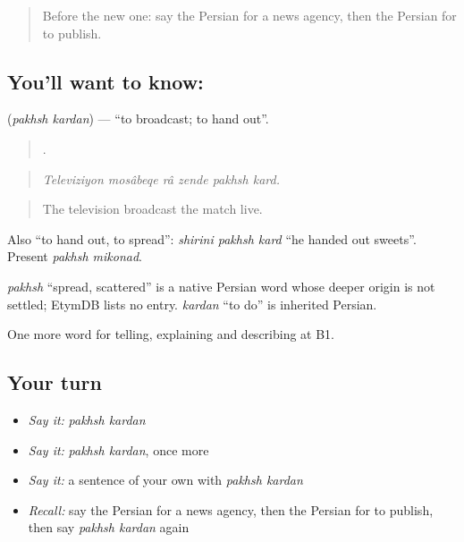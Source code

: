 \begin{quote}
Before the new one: say the Persian for a news agency, then the Persian for to publish.
\end{quote}

\subsection*{You'll want to know:  }
\textbf{ } (\emph{pakhsh kardan}) — \textquotedblleft{}to broadcast; to hand out\textquotedblright{}.

\begin{quote}
     .
\end{quote}

\begin{quote}
\emph{Televiziyon mosâbeqe râ zende pakhsh kard.}
\end{quote}

\begin{quote}
The television broadcast the match live.
\end{quote}

Also \textquotedblleft{}to hand out, to spread\textquotedblright{}: \emph{shirini pakhsh kard} \textquotedblleft{}he handed out sweets\textquotedblright{}. Present \emph{pakhsh mikonad}.

\begin{cousinweb}
\emph{pakhsh} \textquotedblleft{}spread, scattered\textquotedblright{} is a native Persian word whose deeper origin is not settled; EtymDB lists no entry. \emph{kardan} \textquotedblleft{}to do\textquotedblright{} is inherited Persian.
\end{cousinweb}

\begin{grammarlens}[title={What you've built}]
One more word for telling, explaining and describing at B1.
\end{grammarlens}

\subsection*{Your turn}
\begin{itemize}
\raggedright
  \item \emph{Say it:} \emph{pakhsh kardan}
  \item \emph{Say it:} \emph{pakhsh kardan}, once more
  \item \emph{Say it:} a sentence of your own with \emph{pakhsh kardan}
  \item \emph{Recall:} say the Persian for a news agency, then the Persian for to publish, then say \emph{pakhsh kardan} again
\end{itemize}

